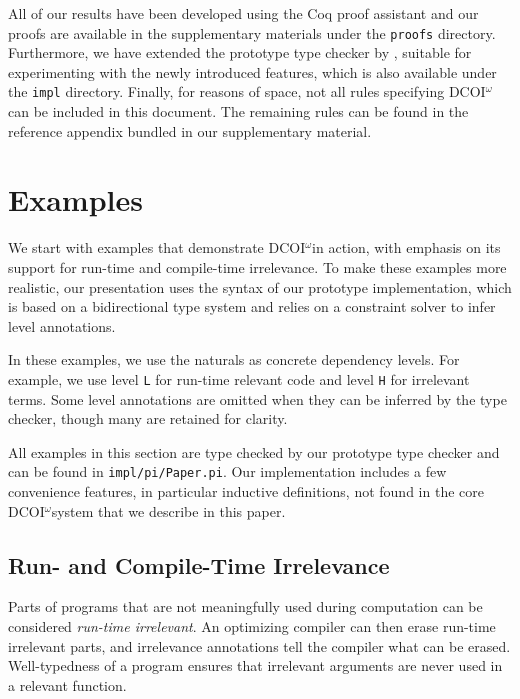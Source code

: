 \documentclass[acmsmall]{acmart}
\makeatletter
\theoremstyle{linked}
\theoremstyle{deflinked}
\theoremstyle{acmdefinition}
\newcommand{\sw}[1]{}
\newcommand{\name}{\texorpdfstring{DCOI$^{\omega}$\@\xspace}{DCOI-omega}}
\makeatother
\begin{document}
All of our results have been developed using the Coq proof
assistant and our proofs are available in the supplementary materials under the \texttt{proofs} directory.
Furthermore, we have extended the prototype type checker by
\citet{liu:dcoi},
suitable for experimenting with the newly introduced features,
which is also available under the \texttt{impl} directory.
Finally, for reasons of space, not all rules specifying \name can be included
in this document. The remaining rules can be found in the reference appendix
bundled in our supplementary material.

\section{Examples} \label{sec:examples}

We start with examples that demonstrate \name in action, with emphasis on its
support for run-time and compile-time irrelevance.  To make these examples more
realistic, our presentation uses the syntax of our prototype
implementation, which is based on a bidirectional type system and
relies on a constraint solver to infer level annotations.

In these examples, we use the naturals as concrete dependency levels. For example,
we use level \texttt{L} for run-time relevant code and level \texttt{H} for irrelevant terms. Some level annotations are omitted when they can be inferred by the type checker, though many are retained for
clarity.

All examples in this section are type checked by our prototype type checker
and can be found in \texttt{impl/pi/Paper.pi}.
Our implementation includes a few convenience features,
in particular inductive definitions,
not found in the core \name system that we describe in this paper.
\sw{Perhaps we
  should replace the False elimination example with \texttt{divides\_to\_Nat}
  from \texttt{impl/pi/Prime.pi}? This only requires natural number induction,
  although it is a lot more complicated of an example.}
\sw{I wish we had more space around the code to set it off in this section}

\subsection{Run- and Compile-Time Irrelevance}

Parts of programs that are not meaningfully used during computation
can be considered \emph{run-time irrelevant}.
An optimizing compiler can then erase run-time irrelevant parts,
and irrelevance annotations tell the compiler what can be erased.
Well-typedness of a program ensures that irrelevant arguments
are never used in a relevant function.
\end{document}
